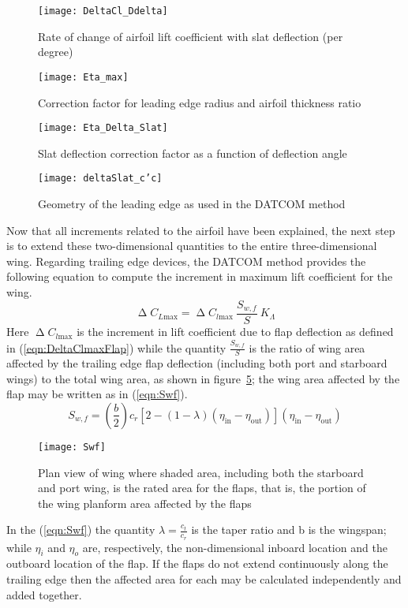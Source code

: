 %
\begin{figure}[H]
\centering
\texttt{[image: DeltaCl\_Ddelta]}
\caption{Rate of change of airfoil lift coefficient with slat deflection (per degree)}
\label{fig:dCldDelta}
\end{figure}
%
\begin{figure}[H]
\centering
\texttt{[image: Eta\_max]}
\caption{Correction factor for leading edge radius and airfoil thickness ratio}
\label{fig:etaDeltaMaxSlat}
\end{figure}
%
\begin{figure}[H]
\centering
\texttt{[image: Eta\_Delta\_Slat]}
\caption{Slat deflection correction factor as a function of deflection angle}
\label{fig:etaDeltaSlat}
\end{figure}
%
\begin{figure}[H]
\centering
\texttt{[image: deltaSlat\_c'c]}
\caption{Geometry of the leading edge as used in the \gls{DATCOM} method}
\label{fig:c'c_deltaSlat}
\end{figure}
%
\noindent
Now that all increments related to the airfoil have been explained, the next step is to extend these two-dimensional quantities to the entire three-dimensional wing.
Regarding trailing edge devices, the \gls{DATCOM} method provides the following equation to compute the increment in maximum lift coefficient for the wing.
%
\begin{equation}
\upDelta C_{L\text{max}}=\upDelta C_{l\text{max}}\ \dfrac{S_{w,f}}{S}\ K_\Lambda
\label{eqn:DeltaCLmaxFlap}
\end{equation}
%
\noindent
Here $\upDelta C_{l\text{max}}$ is the increment in lift coefficient due to flap deflection as defined in (\ref{eqn:DeltaClmaxFlap}) while the quantity $\frac{S_{w,f}}{S}$ is the ratio of wing area affected by the trailing edge flap deflection (including both port and starboard wings) to the total wing area, as shown in figure~\ref{fig:Swf}; the wing area affected by the flap may be written as in (\ref{eqn:Swf}).
%
\begin{equation}
S_{w,f}=\left(\dfrac{b}{2}\right)c_r\left[2-\left(1-\lambda\right)\left(\eta_{\text{in}}-\eta_{\text{out}}\right)\right]\left(\eta_{\text{in}}-\eta_{\text{out}}\right)
\label{eqn:Swf}
\end{equation}
%
\begin{figure}[!b]
\centering
\texttt{[image: Swf]}
\caption{Plan view of wing where shaded area, including both the starboard and port wing, is the rated area for the flaps, that is, the portion of the wing planform area affected by the flaps}
\label{fig:Swf}
\end{figure}
%
\noindent
In the (\ref{eqn:Swf}) the quantity $\lambda=\frac{c_t}{c_r}$ is the taper ratio and b is the wingspan; while $\eta_i$ and $\eta_o$ are, respectively, the non-dimensional inboard location and the outboard location of the flap. If the flaps do not extend continuously along the trailing edge then the affected area for each may be calculated independently and added together.

